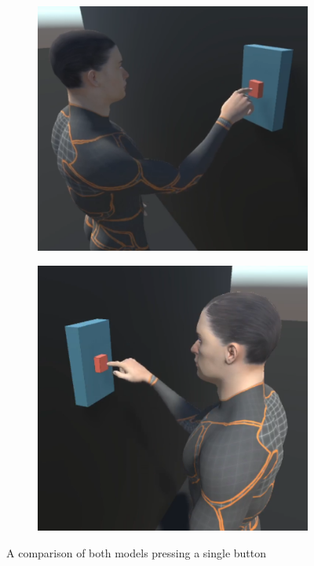 \begin{figure}[h!]
    \centering
    \captionsetup{justification=centering}
    \begin{subfigure}{0.4\textwidth}
        \includegraphics[width=\linewidth]{grafika/h_b_single.png}
    \end{subfigure}
    \begin{subfigure}{0.4\textwidth}
        \includegraphics[width=\linewidth]{grafika/h_ik_single.png}
    \end{subfigure}
    \caption{A comparison of both models pressing a single button}
    \label{fig:h_single}
\end{figure}

